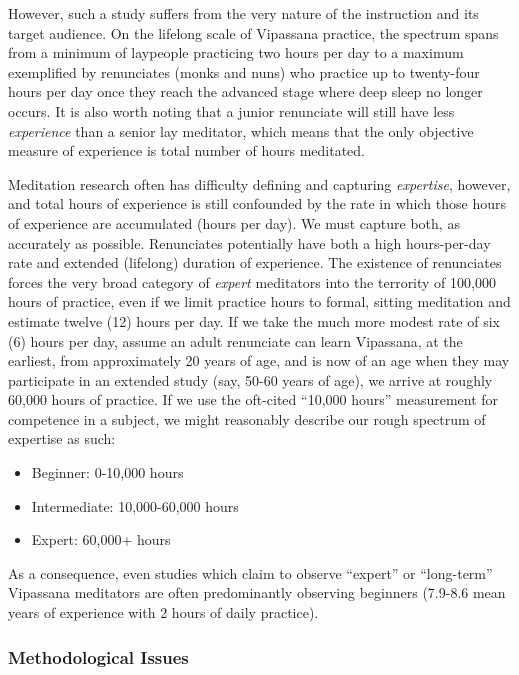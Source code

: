 \documentclass[a4paper, amsfonts, amssymb, amsmath, reprint, showkeys, nofootinbib, twoside]{revtex4-1}
\begin{document}
However, such a study suffers from the very nature of
the instruction and its target audience. On the lifelong scale of Vipassana
practice, the spectrum spans from a minimum of laypeople practicing two hours per day to
a maximum exemplified by renunciates (monks and nuns) who practice up to twenty-four
hours per day once they
reach the advanced stage where deep sleep no longer occurs. It is
also worth noting that a junior renunciate will still have less \textit{experience}
than a senior lay meditator, which means that the only objective measure of
experience is total number of hours meditated. \cite{goleman2017altered}

Meditation research often has difficulty defining and capturing \textit{expertise},
however, and total hours of experience is still confounded by the rate in which those
hours of experience are accumulated (hours per day). We must capture both, as accurately as
possible. Renunciates potentially have both a high hours-per-day rate and extended
(lifelong) duration of experience. The existence of renunciates forces the very
broad category of \textit{expert} meditators into the terrority of 100,000 hours
of practice, even if we limit practice hours to formal, sitting meditation and
estimate twelve (12) hours per day. If we take the much more modest rate of six (6)
hours per day, assume an adult renunciate can learn Vipassana, at the earliest, from
approximately 20 years of
age, and is now of an age when they may participate in an extended study (say, 50-60
years of age), we arrive at roughly 60,000 hours of practice. If we use the oft-cited
``10,000 hours'' measurement for competence in a subject, we might reasonably
describe our rough spectrum of expertise as such:

\begin{itemize}
	\item Beginner: 0-10,000 hours
	\item Intermediate: 10,000-60,000 hours
	\item Expert: 60,000+ hours
\end{itemize}

As a consequence, even studies which claim to observe ``expert'' or ``long-term''
Vipassana meditators are often predominantly observing beginners (7.9-8.6 mean years
of experience with 2 hours of daily practice). \cite{chiesa2010vipassana}

\subsubsection{Methodological Issues}
\end{document}
